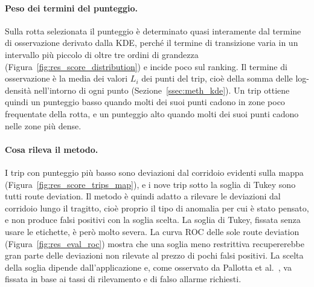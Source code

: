 \paragraph{Peso dei termini del punteggio.} Sulla rotta selezionata il punteggio è determinato
quasi interamente dal termine di osservazione derivato dalla KDE, perché il termine di
transizione varia in un intervallo più piccolo di oltre tre ordini di grandezza
(Figura~\ref{fig:res_score_distribution}) e incide poco sul ranking. Il termine di
osservazione è la media dei valori $L_i$ dei punti del trip, cioè della somma delle
log-densità nell'intorno di ogni punto (Sezione~\ref{ssec:meth_kde}). Un trip ottiene quindi
un punteggio basso quando molti dei suoi punti cadono in zone poco frequentate della rotta, e un
punteggio alto quando molti dei suoi punti cadono nelle zone più dense.

\paragraph{Cosa rileva il metodo.} I trip con punteggio più basso sono deviazioni dal corridoio
evidenti sulla mappa (Figura~\ref{fig:res_score_trips_map}), e i nove trip sotto la soglia di
Tukey sono tutti route deviation. Il metodo è quindi adatto a rilevare le deviazioni dal
corridoio lungo il tragitto, cioè proprio il tipo di anomalia per cui è stato pensato, e non
produce falsi positivi con la soglia scelta. La soglia di Tukey, fissata senza usare le
etichette, è però molto severa. La curva ROC delle sole route deviation
(Figura~\ref{fig:res_eval_roc}) mostra che una soglia meno restrittiva recupererebbe gran parte
delle deviazioni non rilevate al prezzo di pochi falsi positivi. La scelta della soglia dipende
dall'applicazione e, come osservato da Pallotta et al.~\cite{pallotta}, va fissata in base ai tassi di rilevamento
e di falso allarme richiesti.

